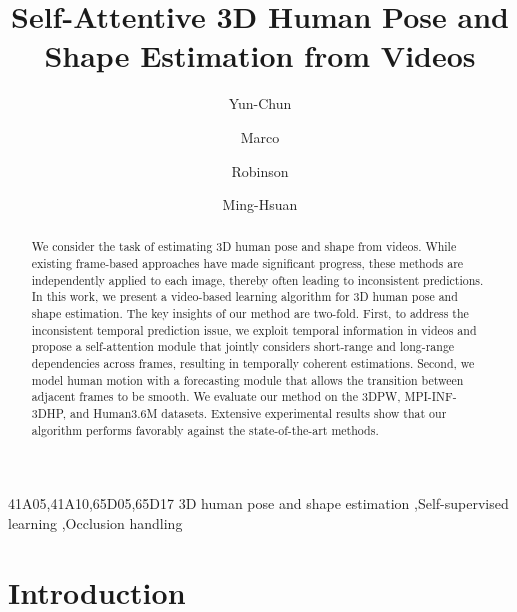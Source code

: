 \documentclass[times,referee,twocolumn,final,authoryear]{elsarticle}
\begin{document}
\begin{frontmatter}

\title{Self-Attentive 3D Human Pose and Shape Estimation from Videos}

\author[1]{Yun-Chun } 
\author[2]{Marco }
\author[3]{Robinson }
\author[4]{Ming-Hsuan }

\address[1]{Department of Computer Science, University of Toronto, ON, Canada}
\address[2]{eBay Inc., San Jose, CA, USA}
\address[3]{Amazon, Oakland, CA, USA}
\address[4]{School of Engineering, University of California at Merced, CA, USA}


\begin{abstract}
We consider the task of estimating 3D human pose and shape from videos. 
While existing frame-based approaches have made significant progress, these methods are independently applied to each image, thereby often leading to inconsistent predictions.
In this work, we present a video-based learning algorithm for 3D human pose and shape estimation.
The key insights of our method are two-fold.
First, to address the inconsistent temporal prediction issue, we exploit temporal information in videos and propose a self-attention module that jointly considers short-range and long-range dependencies across frames, resulting in temporally coherent estimations.
Second, we model human motion with a forecasting module that allows the transition between adjacent frames to be smooth.
We evaluate our method on the 3DPW, MPI-INF-3DHP, and Human3.6M datasets. 
Extensive experimental results show that our algorithm performs favorably against the state-of-the-art methods.
\end{abstract}

\begin{keyword}
\MSC 41A05\sep 41A10\sep 65D05\sep 65D17
\KWD 3D human pose and shape estimation \sep Self-supervised learning \sep Occlusion handling

\end{keyword}

\end{frontmatter}



\section{Introduction}
\end{document}
